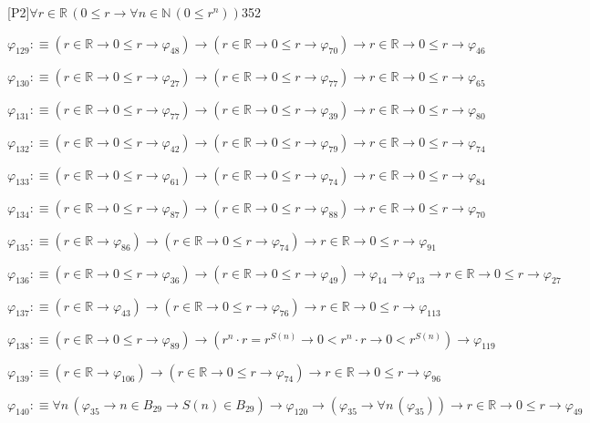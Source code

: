 \begin{fullproof}{[P2]}{$\forall r \in \mathbb{R}\,(0 \leq r \to \forall n \in \mathbb{N}\,(0 \leq {{r}^{n}}))$}{352}
\begin{abbrevlist}
\item $\varphi_{129} :\equiv (r \in \mathbb{R} \to 0 \leq r \to \varphi_{48}) \to (r \in \mathbb{R} \to 0 \leq r \to \varphi_{70}) \to r \in \mathbb{R} \to 0 \leq r \to \varphi_{46}$
\item $\varphi_{130} :\equiv (r \in \mathbb{R} \to 0 \leq r \to \varphi_{27}) \to (r \in \mathbb{R} \to 0 \leq r \to \varphi_{77}) \to r \in \mathbb{R} \to 0 \leq r \to \varphi_{65}$
\item $\varphi_{131} :\equiv (r \in \mathbb{R} \to 0 \leq r \to \varphi_{77}) \to (r \in \mathbb{R} \to 0 \leq r \to \varphi_{39}) \to r \in \mathbb{R} \to 0 \leq r \to \varphi_{80}$
\item $\varphi_{132} :\equiv (r \in \mathbb{R} \to 0 \leq r \to \varphi_{42}) \to (r \in \mathbb{R} \to 0 \leq r \to \varphi_{79}) \to r \in \mathbb{R} \to 0 \leq r \to \varphi_{74}$
\item $\varphi_{133} :\equiv (r \in \mathbb{R} \to 0 \leq r \to \varphi_{61}) \to (r \in \mathbb{R} \to 0 \leq r \to \varphi_{74}) \to r \in \mathbb{R} \to 0 \leq r \to \varphi_{84}$
\item $\varphi_{134} :\equiv (r \in \mathbb{R} \to 0 \leq r \to \varphi_{87}) \to (r \in \mathbb{R} \to 0 \leq r \to \varphi_{88}) \to r \in \mathbb{R} \to 0 \leq r \to \varphi_{70}$
\item $\varphi_{135} :\equiv (r \in \mathbb{R} \to \varphi_{86}) \to (r \in \mathbb{R} \to 0 \leq r \to \varphi_{74}) \to r \in \mathbb{R} \to 0 \leq r \to \varphi_{91}$
\item $\varphi_{136} :\equiv (r \in \mathbb{R} \to 0 \leq r \to \varphi_{36}) \to (r \in \mathbb{R} \to 0 \leq r \to \varphi_{49}) \to \varphi_{14} \to \varphi_{13} \to r \in \mathbb{R} \to 0 \leq r \to \varphi_{27}$
\item $\varphi_{137} :\equiv (r \in \mathbb{R} \to \varphi_{43}) \to (r \in \mathbb{R} \to 0 \leq r \to \varphi_{76}) \to r \in \mathbb{R} \to 0 \leq r \to \varphi_{113}$
\item $\varphi_{138} :\equiv (r \in \mathbb{R} \to 0 \leq r \to \varphi_{89}) \to ({{r}^{n}} \cdot r = {{r}^{S(n)}} \to 0 < {{r}^{n}} \cdot r \to 0 < {{r}^{S(n)}}) \to \varphi_{119}$
\item $\varphi_{139} :\equiv (r \in \mathbb{R} \to \varphi_{106}) \to (r \in \mathbb{R} \to 0 \leq r \to \varphi_{74}) \to r \in \mathbb{R} \to 0 \leq r \to \varphi_{96}$
\item $\varphi_{140} :\equiv \forall n\,(\varphi_{35} \to n \in B_{29} \to S(n) \in B_{29}) \to \varphi_{120} \to (\varphi_{35} \to \forall n\,(\varphi_{35})) \to r \in \mathbb{R} \to 0 \leq r \to \varphi_{49}$

\end{abbrevlist}
\end{fullproof}
